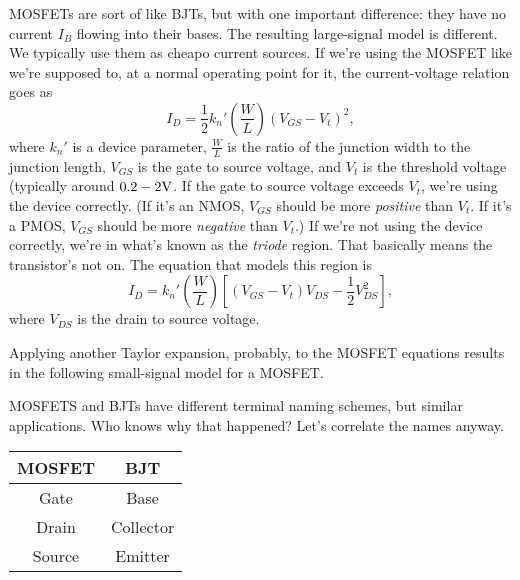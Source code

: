 \documentclass[12pt]{report}
\begin{document}
MOSFETs are sort of like BJTs, but with one important difference: they have no current $I_{B}$ flowing into their bases. The resulting large-signal model is different. We typically use them as cheapo current sources. If we're using the MOSFET like we're supposed to, at a normal operating point for it, the current-voltage relation goes as
\begin{equation}
\label{eq:43}
I_{D} = \frac{1}{2} k_{n}' \left( \frac{W}{L} \right) \left( V_{GS} - V_{t} \right)^{2},
\end{equation}
where $k_{n}'$ is a device parameter, $\frac{W}{L}$ is the ratio of the junction width to the junction length, $V_{GS}$ is the gate to source voltage, and $V_{t}$ is the threshold voltage (typically around $0.2 \-- 2 \si{\V}$. If the gate to source voltage exceeds $V_{t}$, we're using the device correctly. (If it's an NMOS, $V_{GS}$ should be more \textit{positive} than $V_{t}$. If it's a PMOS, $V_{GS}$ should be more \textit{negative} than $V_{t}$.) If we're not using the device correctly, we're in what's known as the \textit{triode} region. That basically means the transistor's not on. The equation that models this region is
\begin{equation}
\label{eq:44}
I_{D} = k_{n}' \left( \frac{W}{L} \right) \left[ \left( V_{GS} - V_{t} \right) V_{DS} - \frac{1}{2} V_{DS}^{2} \right],
\end{equation}
where $V_{DS}$ is the drain to source voltage.

Applying another Taylor expansion, probably, to the MOSFET equations results in the following small-signal model for a MOSFET.

MOSFETS and BJTs have different terminal naming schemes, but similar applications. Who knows why that happened? Let's correlate the names anyway.

\begin{center}
  \begin{tabular}{|c|c|}
    \hline
  MOSFET & BJT \\
  \hline
  Gate & Base \\
  Drain & Collector \\
    Source & Emitter \\
    \hline
\end{tabular}
\end{center}
\end{document}
